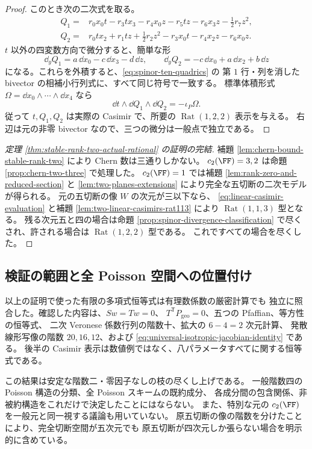 \begin{proof}
このとき次の二次式を取る。
\begin{align}
 Q_1={}&r_0x_0t-r_3tx_3-r_4x_0z-r_5tz-r_6x_3z-\tfrac12r_7z^2,
 \label{eq:isotropic-Q1}\\
 Q_2={}&r_0tx_2+r_1tz+\tfrac12r_2z^2-r_3x_0t-r_4x_2z-r_6x_0z.
 \label{eq:isotropic-Q2}
\end{align}
$t$ 以外の四変数方向で微分すると、簡単な形
\[
 \dd_yQ_1=a\,\dd x_0-c\,\dd x_3-d\,\dd z,
 \qquad
 \dd_yQ_2=-c\,\dd x_0+a\,\dd x_2+b\,\dd z
\]
になる。これらを外積すると、\eqref{eq:spinor-ten-quadrics} の
第 $1$ 行・列を消した bivector の相補小行列式に、すべて同じ符号で一致する。
標準体積形式 $\Omega=\dd x_0\wedge\cdots\wedge\dd x_4$ なら
\begin{equation}
 \dd t\wedge\dd Q_1\wedge\dd Q_2=-\iota_P\Omega.
 \label{eq:universal-isotropic-jacobian-identity}
\end{equation}
従って $t,Q_1,Q_2$ は実際の Casimir で、所要の
$\operatorname{Rat}(1,2,2)$ 表示を与える。
右辺は元の非零 bivector なので、三つの微分は一般点で独立である。
\end{proof}

\begin{proof}[定理 \ref{thm:stable-rank-two-actual-rational} の証明の完結]
補題 \ref{lem:chern-bound-stable-rank-two} により Chern 数は三通りしかない。
$c_2(\FF)=3,2$ は命題 \ref{prop:chern-two-three} で処理した。
$c_2(\FF)=1$ では補題 \ref{lem:rank-zero-and-reduced-section} と
\ref{lem:two-planes-extensions} により完全な五切断の二次モデルが得られる。
元の五切断の像 $W$ の次元が三以下なら、
\eqref{eq:linear-casimir-evaluation} と補題
\ref{lem:two-linear-casimirs-rat113} により
$\operatorname{Rat}(1,1,3)$ 型となる。
残る次元五と四の場合は命題 \ref{prop:spinor-divergence-classification}
で尽くされ、許される場合は $\operatorname{Rat}(1,2,2)$ 型である。
これですべての場合を尽くした。
\end{proof}

\subsection{検証の範囲と全 Poisson 空間への位置付け}

以上の証明で使った有限の多項式恒等式は有理数係数の厳密計算でも
独立に照合した。確認した内容は、$Sw=Tw=0$、
$T^{\mathsf T}P_{\mathrm{geo}}=0$、五つの Pfaffian、等方性の恒等式、
二次 Veronese 係数行列の階数十、拡大の $6-4=2$ 次元計算、
発散線形写像の階数 $20,16,12$、および
\eqref{eq:universal-isotropic-jacobian-identity} である。
後半の Casimir 表示は数値例ではなく、八パラメータすべてに関する恒等式である。

この結果は安定な階数二・零因子なしの枝の尽くし上げである。
一般階数四の Poisson 構造の分類、全 Poisson スキームの既約成分、
各成分間の包含関係、非被約構造をこれだけで決定したことにはならない。
また、特別な元の $c_2(\FF)$ を一般元と同一視する議論も用いていない。
原五切断の像の階数を分けたことにより、完全切断空間が五次元でも
原五切断が四次元しか張らない場合を明示的に含めている。
